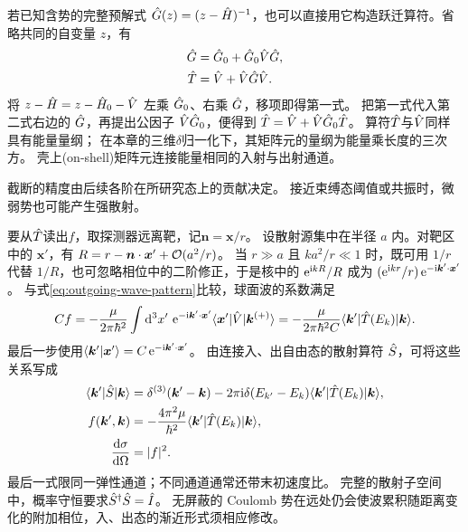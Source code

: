 若已知含势的完整预解式 $\hat{G}(z) = (z - \hat{H})^{-1}$，也可以直接用它构造跃迁算符。省略共同的自变量 $z$，有
\begin{subequations}
    \begin{align}
        \hat{G} &= \hat{G}_0 + \hat{G}_0\hat{V}\hat{G},\\
        \hat{T} &= \hat{V} + \hat{V}\hat{G}\hat{V}.
    \end{align}
\end{subequations}
将 $z - \hat{H} = z - \hat{H}_0 - \hat{V}$ 左乘 $\hat{G}_0$、右乘 $\hat{G}$，移项即得第一式。
把第一式代入第二式右边的 $\hat{G}$，再提出公因子 $\hat{V}\hat{G}_0$，便得到 $\hat{T} = \hat{V} + \hat{V}\hat{G}_0\hat{T}$。
算符$\hat{T}$与$\hat{V}$同样具有能量量纲；
在本章的三维$\delta$归一化下，其矩阵元的量纲为能量乘长度的三次方。
壳上(on-shell)矩阵元连接能量相同的入射与出射通道。

截断的精度由后续各阶在所研究态上的贡献决定。
接近束缚态阈值或共振时，微弱势也可能产生强散射。

要从$\hat{T}$读出$f$，取探测器远离靶，记$\bm n = \bm x/r$。
设散射源集中在半径 $a$ 内。对靶区中的 $\bm x'$，有 $R = r - \bm n \cdot \bm x' + \mathcal{O}(a^2/r)$。
当 $r \gg a$ 且 $ka^2/r \ll 1$ 时，既可用 $1/r$ 代替 $1/R$，也可忽略相位中的二阶修正，于是核中的 $\mathop{}\!\mathrm{e}^{\mathrm{i} kR}/R$ 成为 $(\mathop{}\!\mathrm{e}^{\mathrm{i} kr}/r)\mathop{}\!\mathrm{e}^{-\mathrm{i}\bm k'\cdot\bm x'}$。
与式\eqref{eq:outgoing-wave-pattern}比较，球面波的系数满足
\begin{equation}
    C f = -\frac{\mu}{2\pi\hbar^2}\int\mathop{}\!\mathrm{d}^3 x'\,
        \mathop{}\!\mathrm{e}^{-\mathrm{i}\bm k'\cdot\bm x'}\langle\bm x'\vert\hat{V}\vert\bm k^{(+)}\rangle
    = -\frac{\mu}{2\pi\hbar^2 C}\langle\bm k'\vert\hat{T}(E_k)\vert\bm k\rangle.
\end{equation}
最后一步使用$\langle\bm k'\vert\bm x'\rangle = C\mathop{}\!\mathrm{e}^{-\mathrm{i}\bm k'\cdot\bm x'}$。
由连接入、出自由态的散射算符 $\hat{S}$，可将这些关系写成
\begin{subequations}\label{eq:scatnorm}
    \begin{align}
        \langle\bm k'\vert\hat{S}\vert\bm k\rangle
            &= \delta^{(3)}(\bm k' - \bm k) - 2\pi\mathrm{i}\delta(E_{k'} - E_k)\langle\bm k'\vert\hat{T}(E_k)\vert\bm k\rangle,\\
        f(\bm k',\bm k) &= -\frac{4\pi^2\mu}{\hbar^2}\langle\bm k'\vert\hat{T}(E_k)\vert\bm k\rangle,\label{eq:scattering-amplitude-T}\\
        \frac{\mathop{}\!\mathrm{d}\sigma}{\mathrm{d}\Omega} &= \lvert f\rvert^2.
    \end{align}
\end{subequations}
最后一式限同一弹性通道；不同通道通常还带末初速度比。
完整的散射子空间中，概率守恒要求$\hat{S}^\dagger \hat{S} = \hat{I}$。
无屏蔽的 Coulomb 势在远处仍会使波累积随距离变化的附加相位，入、出态的渐近形式须相应修改。

